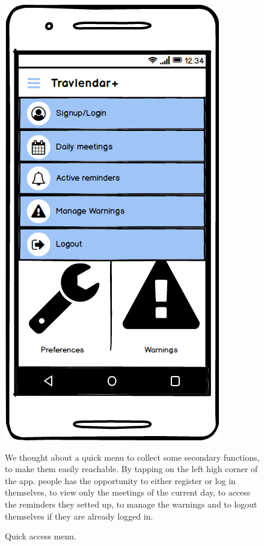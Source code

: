 \documentclass[11pt]{article}
\begin{document}
	\begin{figure}
	\centering
	\includegraphics[width=0.7\linewidth]{QuickMenu.png}
	\caption{Quick access menu.}
	\label{fig:quickmenu}
	\begin{center}
		We thought about a quick menu to collect some secondary functions, to make them easily reachable. By tapping on the left high corner of the app. people has the opportunity to either register or log in themselves, to view only the meetings of the current day, to access the reminders they setted up, to manage the warnings and to logout themselves if they are already logged in.
	\end{center}
	\end{figure}
\end{document}
